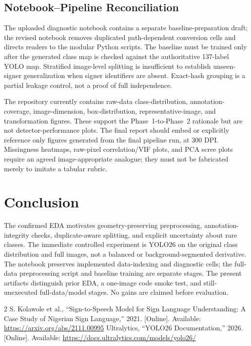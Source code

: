 \documentclass[conference]{IEEEtran}
\begin{document}
\subsection{Notebook--Pipeline Reconciliation}
The uploaded diagnostic notebook contains a separate baseline-preparation draft; the revised notebook removes duplicated path-dependent conversion cells and directs readers to the modular Python scripts. The baseline must be trained only after the generated class map is checked against the authoritative 137-label YOLO map. Stratified image-level splitting is insufficient to establish unseen-signer generalization when signer identifiers are absent. Exact-hash grouping is a partial leakage control, not a proof of full independence.
\par The repository currently contains raw-data class-distribution, annotation-coverage, image-dimension, box-distribution, representative-image, and transformation figures. These support the Phase~1-to-Phase~2 rationale but are not detector-performance plots. The final report should embed or explicitly reference only figures generated from the final pipeline run, at 300 DPI. Missingness heatmaps, raw-pixel correlation/VIF plots, and PCA scree plots require an agreed image-appropriate analogue; they must not be fabricated merely to imitate a tabular rubric.
\section{Conclusion}
The confirmed EDA motivates geometry-preserving preprocessing, annotation-integrity checks, duplicate-aware splitting, and explicit uncertainty about rare classes. The immediate controlled experiment is YOLO26 on the original class distribution and full images, not a balanced or background-segmented derivative. The notebook preserves implemented data-indexing and diagnostic cells; the full-data preprocessing script and baseline training are separate stages. The present artifacts distinguish prior EDA, a one-image code smoke test, and still-unexecuted full-data/model stages. No gains are claimed before evaluation.
\begin{thebibliography}{2}
 S. Kolawole et al., ``Sign-to-Speech Model for Sign Language Understanding: A Case Study of Nigerian Sign Language,'' 2021. [Online]. Available: \url{https://arxiv.org/abs/2111.00995}
 Ultralytics, ``YOLO26 Documentation,'' 2026. [Online]. Available: \url{https://docs.ultralytics.com/models/yolo26/}
\end{thebibliography}
\end{document}
